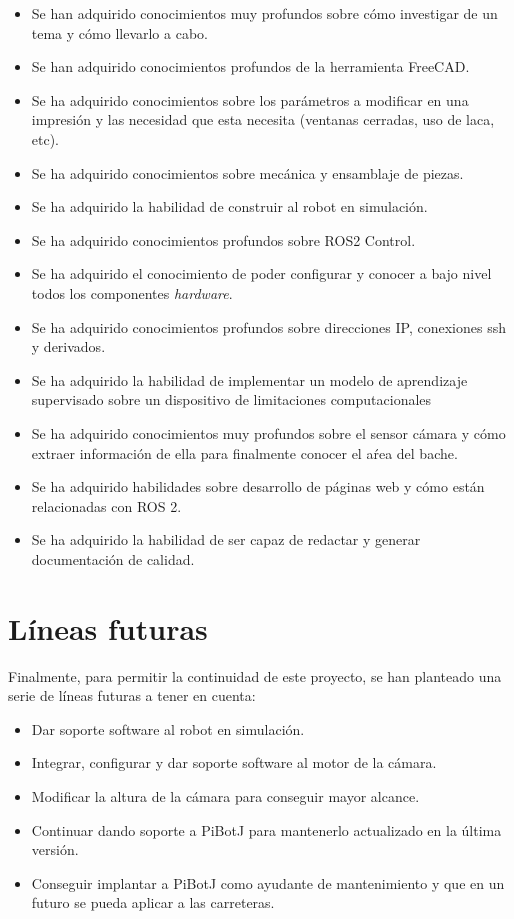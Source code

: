 \begin{itemize}
	\item Se han adquirido conocimientos muy profundos sobre cómo investigar de un tema y cómo llevarlo a cabo.
	\item Se han adquirido conocimientos profundos de la herramienta FreeCAD.
	\item Se ha adquirido conocimientos sobre los parámetros a modificar en una impresión y las necesidad que esta necesita (ventanas cerradas, uso de laca, etc).
	\item Se ha adquirido conocimientos sobre mecánica y ensamblaje de piezas. 
	\item Se ha adquirido la habilidad de construir al robot en simulación.
	\item Se ha adquirido conocimientos profundos sobre ROS2 Control.
	\item Se ha adquirido el conocimiento de poder configurar y conocer a bajo nivel todos los componentes \textit{hardware}.
	\item Se ha adquirido conocimientos profundos sobre direcciones IP, conexiones ssh y derivados.
	\item Se ha adquirido la habilidad de implementar un modelo de aprendizaje supervisado sobre un dispositivo de limitaciones computacionales
	\item Se ha adquirido conocimientos muy profundos sobre el sensor cámara y cómo extraer información de ella para finalmente conocer el aŕea del bache. 
	\item Se ha adquirido habilidades sobre desarrollo de páginas web y cómo están relacionadas con ROS 2.
	\item Se ha adquirido la habilidad de ser capaz de redactar y generar documentación de calidad.
\end{itemize}
 


\section{Líneas futuras}

Finalmente, para permitir la continuidad de este proyecto, se han planteado una serie de líneas futuras a tener en cuenta: 

\begin{itemize}
	\item Dar soporte software al robot en simulación. 
	\item Integrar, configurar y dar soporte software al motor de la cámara.
	\item Modificar la altura de la cámara para conseguir mayor alcance.
	\item Continuar dando soporte a PiBotJ para mantenerlo actualizado en la última versión.
	\item Conseguir implantar a PiBotJ como ayudante de mantenimiento y que en un futuro se pueda aplicar a las carreteras.
\end{itemize}

